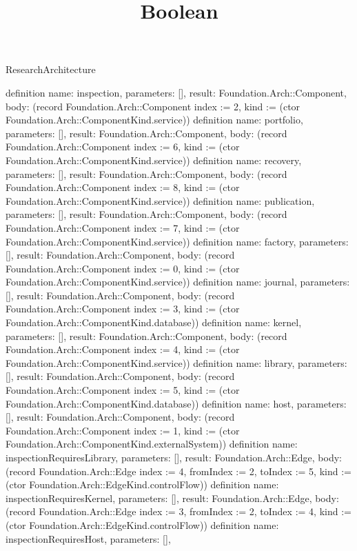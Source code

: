 \begin{lexlean}{ResearchArchitecture}
\title{Boolean}
\begin{semanticmodule}
definition{
 name: inspection,
 parameters: [],
 result: Foundation.Arch::Component,
 body: (record Foundation.Arch::Component {index := 2, kind := (ctor Foundation.Arch::ComponentKind.service)})
}
definition{
 name: portfolio,
 parameters: [],
 result: Foundation.Arch::Component,
 body: (record Foundation.Arch::Component {index := 6, kind := (ctor Foundation.Arch::ComponentKind.service)})
}
definition{
 name: recovery,
 parameters: [],
 result: Foundation.Arch::Component,
 body: (record Foundation.Arch::Component {index := 8, kind := (ctor Foundation.Arch::ComponentKind.service)})
}
definition{
 name: publication,
 parameters: [],
 result: Foundation.Arch::Component,
 body: (record Foundation.Arch::Component {index := 7, kind := (ctor Foundation.Arch::ComponentKind.service)})
}
definition{
 name: factory,
 parameters: [],
 result: Foundation.Arch::Component,
 body: (record Foundation.Arch::Component {index := 0, kind := (ctor Foundation.Arch::ComponentKind.service)})
}
definition{
 name: journal,
 parameters: [],
 result: Foundation.Arch::Component,
 body: (record Foundation.Arch::Component {index := 3, kind := (ctor Foundation.Arch::ComponentKind.database)})
}
definition{
 name: kernel,
 parameters: [],
 result: Foundation.Arch::Component,
 body: (record Foundation.Arch::Component {index := 4, kind := (ctor Foundation.Arch::ComponentKind.service)})
}
definition{
 name: library,
 parameters: [],
 result: Foundation.Arch::Component,
 body: (record Foundation.Arch::Component {index := 5, kind := (ctor Foundation.Arch::ComponentKind.database)})
}
definition{
 name: host,
 parameters: [],
 result: Foundation.Arch::Component,
 body: (record Foundation.Arch::Component {index := 1, kind := (ctor Foundation.Arch::ComponentKind.externalSystem)})
}
definition{
 name: inspectionRequiresLibrary,
 parameters: [],
 result: Foundation.Arch::Edge,
 body: (record Foundation.Arch::Edge {index := 4, fromIndex := 2, toIndex := 5, kind := (ctor Foundation.Arch::EdgeKind.controlFlow)})
}
definition{
 name: inspectionRequiresKernel,
 parameters: [],
 result: Foundation.Arch::Edge,
 body: (record Foundation.Arch::Edge {index := 3, fromIndex := 2, toIndex := 4, kind := (ctor Foundation.Arch::EdgeKind.controlFlow)})
}
definition{
 name: inspectionRequiresHost,
 parameters: [],
}
\end{semanticmodule}
\end{lexlean}
